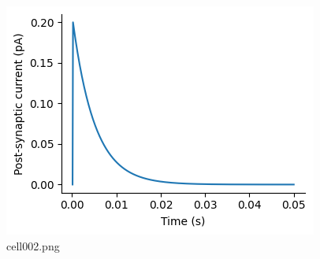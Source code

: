 \begin{figure}[ht]
	\centering
	\includegraphics[scale=0.8, max width=\linewidth]{./fig/synapse-model/kinetic-synapse/cell002.png}
	\caption{cell002.png}
	\label{cell002.png}
\end{figure}
